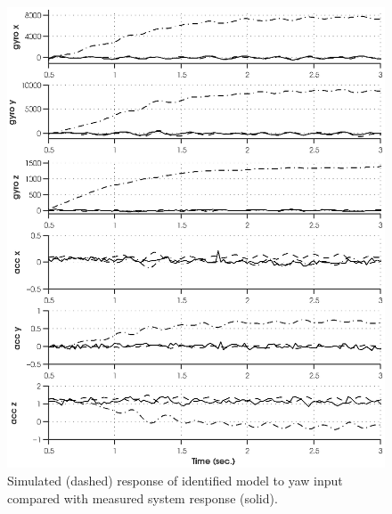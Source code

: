 \newpage
\begin{figure}[htb!]
	\centering
	\includegraphics{../fig/sim_1760_moesp.eps}
	\caption{Simulated (dashed) response of identified model to yaw input compared with measured system response (solid).}
\end{figure}\clearpage





